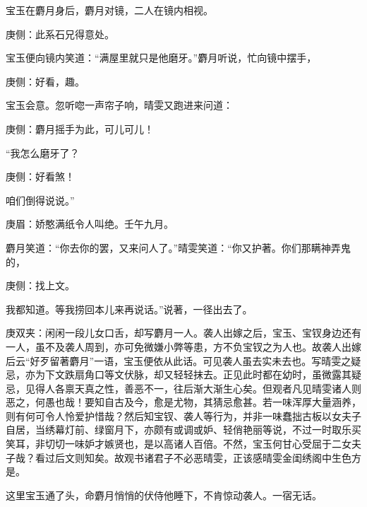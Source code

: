 \begin{parag}
    宝玉在麝月身后，麝月对镜，二人在镜内相视。\begin{note}庚侧：此系石兄得意处。\end{note}宝玉便向镜内笑道：“满屋里就只是他磨牙。”麝月听说，忙向镜中摆手，\begin{note}庚侧：好看，趣。\end{note}宝玉会意。忽听唿一声帘子响，晴雯又跑进来问道：\begin{note}庚侧：麝月摇手为此，可儿可儿！\end{note}“我怎么磨牙了？\begin{note}庚侧：好看煞！\end{note}咱们倒得说说。”\begin{note}庚眉：娇憨满纸令人叫绝。壬午九月。\end{note}麝月笑道：“你去你的罢，又来问人了。”晴雯笑道：“你又护著。你们那瞒神弄鬼的，\begin{note}庚侧：找上文。\end{note}我都知道。等我捞回本儿来再说话。”说著，一径出去了。\begin{note}庚双夹：闲闲一段儿女口舌，却写麝月一人。袭人出嫁之后，宝玉、宝钗身边还有一人，虽不及袭人周到，亦可免微嫌小弊等患，方不负宝钗之为人也。故袭人出嫁后云“好歹留著麝月”一语，宝玉便依从此话。可见袭人虽去实未去也。写晴雯之疑忌，亦为下文跌扇角口等文伏脉，却又轻轻抹去。正见此时都在幼时，虽微露其疑忌，见得人各禀天真之性，善恶不一，往后渐大渐生心矣。但观者凡见晴雯诸人则恶之，何愚也哉！要知自古及今，愈是尤物，其猜忌愈甚。若一味浑厚大量涵养，则有何可令人怜爱护惜哉？然后知宝钗、袭人等行为，并非一味蠢拙古板以女夫子自居，当绣幕灯前、绿窗月下，亦颇有或调或妒、轻俏艳丽等说，不过一时取乐买笑耳，非切切一味妒才嫉贤也，是以高诸人百倍。不然，宝玉何甘心受屈于二女夫子哉？看过后文则知矣。故观书诸君子不必恶晴雯，正该感晴雯金闺绣阁中生色方是。\end{note}这里宝玉通了头，命麝月悄悄的伏侍他睡下，不肯惊动袭人。一宿无话。
\end{parag}



